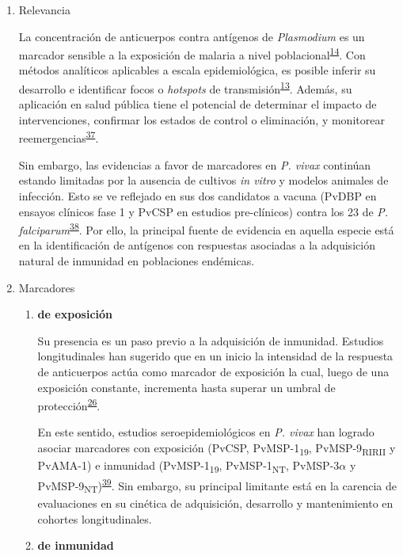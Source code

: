 \documentclass[]{article}
\begin{document}
\begin{enumerate}
\def\labelenumi{\alph{enumi}.}
\item
  Relevancia

  La concentración de anticuerpos contra antígenos de \emph{Plasmodium}
  es un marcador sensible a la exposición de malaria a nivel
  poblacional\textsuperscript{\protect\hyperlink{ref-elliott2014}{14}}.
  Con métodos analíticos aplicables a escala epidemiológica, es posible
  inferir su desarrollo e identificar focos o \emph{hotspots} de
  transmisión\textsuperscript{\protect\hyperlink{ref-hotspots2015}{13}}.
  Además, su aplicación en salud pública tiene el potencial de
  determinar el impacto de intervenciones, confirmar los estados de
  control o eliminación, y monitorear
  reemergencias\textsuperscript{\protect\hyperlink{ref-sepulveda2015}{37}}.

  Sin embargo, las evidencias a favor de marcadores en \emph{P. vivax}
  continúan estando limitadas por la ausencia de cultivos \emph{in
  vitro} y modelos animales de infección. Esto se ve reflejado en sus
  dos candidatos a vacuna (PvDBP en ensayos clínicos fase 1 y PvCSP en
  estudios pre-clínicos) contra los 23 de \emph{P.
  falciparum}\textsuperscript{\protect\hyperlink{ref-rainbow2016}{38}}.
  Por ello, la principal fuente de evidencia en aquella especie está en
  la identificación de antígenos con respuestas asociadas a la
  adquisición natural de inmunidad en poblaciones endémicas.
\item
  Marcadores

  \begin{enumerate}
  \def\labelenumii{\roman{enumii}.}
  \item
    \textbf{de exposición}

    Su presencia es un paso previo a la adquisición de inmunidad.
    Estudios longitudinales han sugerido que en un inicio la intensidad
    de la respuesta de anticuerpos actúa como marcador de exposición la
    cual, luego de una exposición constante, incrementa hasta superar un
    umbral de
    protección\textsuperscript{\protect\hyperlink{ref-Stanisic2015}{26}}.

    En este sentido, estudios seroepidemiológicos en \emph{P. vivax} han
    logrado asociar marcadores con exposición (PvCSP,
    PvMSP-1\textsubscript{19}, PvMSP-9\textsubscript{RIRII} y PvAMA-1) e
    inmunidad (PvMSP-1\textsubscript{19}, PvMSP-1\textsubscript{NT},
    PvMSP-3\(\alpha\) y
    PvMSP-9\textsubscript{NT})\textsuperscript{\protect\hyperlink{ref-cutts2014meta}{39}}.
    Sin embargo, su principal limitante está en la carencia de
    evaluaciones en su cinética de adquisición, desarrollo y
    mantenimiento en cohortes longitudinales. 
  \item
    \textbf{de inmunidad}


\end{enumerate}
\end{enumerate}
\end{document}
